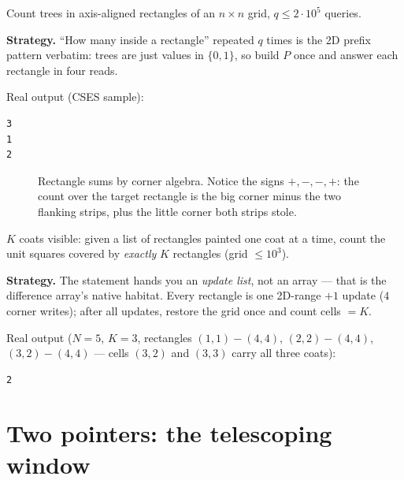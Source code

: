 \begin{example}\label{ex:forest}
Count trees in axis-aligned rectangles of an $n \times n$ grid,
$q \le 2\cdot10^5$ queries.
\par\smallskip
\textbf{Strategy.} ``How many inside a rectangle'' repeated $q$ times
is the 2D prefix pattern verbatim: trees are just values in
$\{0,1\}$, so build $P$ once and answer each rectangle in four reads.
\par\smallskip
\begin{solution}

Real output (CSES sample):
\begin{lstlisting}[numbers=none]
3
1
2
\end{lstlisting}
\end{solution}
\end{example}

\begin{figure}[ht]\centering

\caption{Rectangle sums by corner algebra. Notice the signs
$+,-,-,+$: the count over the target rectangle is the big corner
minus the two flanking strips, plus the little corner both strips
stole.}
\label{fig:ie2d}
\end{figure}

\begin{example}\label{ex:barn}
$K$ coats visible: given a list of rectangles painted one coat at a
time, count the unit squares covered by \emph{exactly} $K$
rectangles (grid $\le 10^3$).
\par\smallskip
\textbf{Strategy.} The statement hands you an \emph{update list}, not
an array --- that is the difference array's native habitat. Every
rectangle is one 2D-range $+1$ update ($4$ corner writes); after all
updates, restore the grid once and count cells $= K$.
\par\smallskip
\begin{solution}

Real output ($N{=}5$, $K{=}3$, rectangles
$(1,1){-}(4,4)$, $(2,2){-}(4,4)$, $(3,2){-}(4,4)$ --- cells $(3,2)$
and $(3,3)$ carry all three coats):
\begin{lstlisting}[numbers=none]
2
\end{lstlisting}
\end{solution}
\end{example}

\section{Two pointers: the telescoping window}\label{sec:twoptr}


